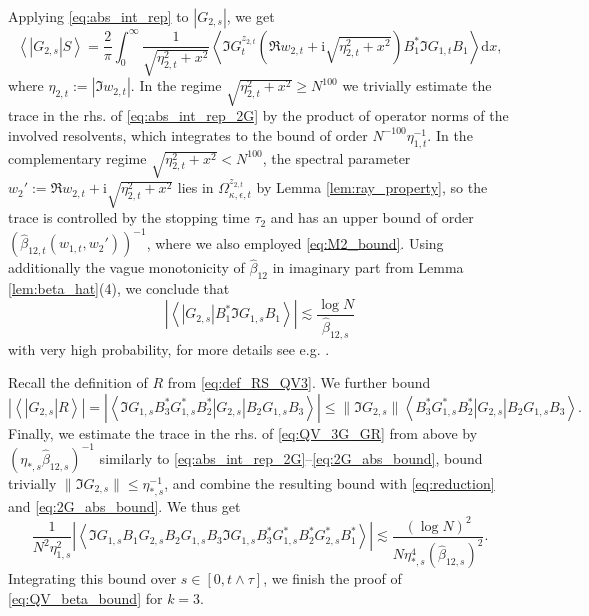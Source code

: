 \documentclass[10pt]{amsart}
\numberwithin{equation}{section}
\newcommand{\dif}{\mathrm{d}}
\newcommand{\ii}{\mathrm{i}}
\begin{document}
Applying \eqref{eq:abs_int_rep} to $|G_{2,s}|$, we get
\begin{equation}
\left\langle |G_{2,s}|S\right\rangle = \frac{2}{\pi}\int_0^\infty\frac{1}{\sqrt{\eta_{2,t}^2+x^2}}\left\langle \Im G^{z_{2,t}}_t\left(\Re w_{2,t}+\ii\sqrt{\eta_{2,t}^2+x^2}\right)B_1^*\Im G_{1,t}B_1\right\rangle\dif x,
\label{eq:abs_int_rep_2G}
\end{equation}
where $\eta_{2,t}:=|\Im w_{2,t}|$. In the regime $\sqrt{\eta_{2,t}^2+x^2}\ge N^{100}$ we trivially estimate the trace in the rhs. of \eqref{eq:abs_int_rep_2G} by the product of operator norms of the involved resolvents, which integrates to the bound of order $N^{-100}\eta_{1,t}^{-1}$. In the complementary regime $\sqrt{\eta_{2,t}^2+x^2}< N^{100}$, the spectral parameter $w_2':=\Re w_{2,t}+\ii\sqrt{\eta_{2,t}^2+x^2}$ lies in $\Omega_{\kappa,\epsilon,t}^{z_{2,t}}$ by Lemma \ref{lem:ray_property}, so the trace is controlled by the stopping time $\tau_2$ and has an upper bound of order $(\widehat{\beta}_{12,t}\left(w_{1,t},w_2'\right))^{-1}$, where we also employed \eqref{eq:M2_bound}. Using additionally the vague monotonicity of $\widehat{\beta}_{12}$ in imaginary part from Lemma \ref{lem:beta_hat}(4), we conclude that
\begin{equation}
\left\vert\left\langle |G_{2,s}|B_1^*\Im G_{1,s} B_1\right\rangle\right\vert \lesssim \frac{\log N}{\widehat{\beta}_{12,s}}
\label{eq:2G_abs_bound}
\end{equation} 
with very high probability, for more details see e.g. \cite[Eq.(5.29)--(5.31)]{Multi_res_llaws}.


Recall the definition of $R$ from \eqref{eq:def_RS_QV3}. We further bound
\begin{equation}
\left\vert\left\langle |G_{2,s}|R\right\rangle\right\vert = \left\vert\left\langle \Im G_{1,s} B_3^*G_{1,s}^*B_2^* |G_{2,s}|B_2 G_{1,s}B_3\right\rangle\right\vert\le \lVert \Im G_{2,s}\rVert \left\langle B_3^*G_{1,s}^*B_2^* |G_{2,s}|B_2 G_{1,s}B_3\right\rangle.
\label{eq:QV_3G_GR}
\end{equation}
Finally, we estimate the trace in the rhs. of \eqref{eq:QV_3G_GR} from above by $(\eta_{*,s}\widehat{\beta}_{12,s})^{-1}$ similarly to \eqref{eq:abs_int_rep_2G}--\eqref{eq:2G_abs_bound}, bound trivially $\lVert \Im G_{2,s}\rVert \le \eta_{*,s}^{-1}$, and combine the resulting bound with \eqref{eq:reduction} and \eqref{eq:2G_abs_bound}. We thus get
\begin{equation*}
\frac{1}{N^2\eta_{1,s}^2} \left\vert\left\langle \Im G_{1,s} B_1 G_{2,s} B_2 G_{1,s} B_3 \Im G_{1,s} B_3^* G_{1,s}^* B_2^* G_{2,s}^* B_1^*\right\rangle\right\vert \lesssim \frac{(\log N)^2}{N\eta_{*,s}^4(\widehat{\beta}_{12,s})^2}.
\end{equation*}
Integrating this bound over $s\in [0,t\wedge\tau]$, we finish the proof of \eqref{eq:QV_beta_bound} for $k=3$.
\end{document}
